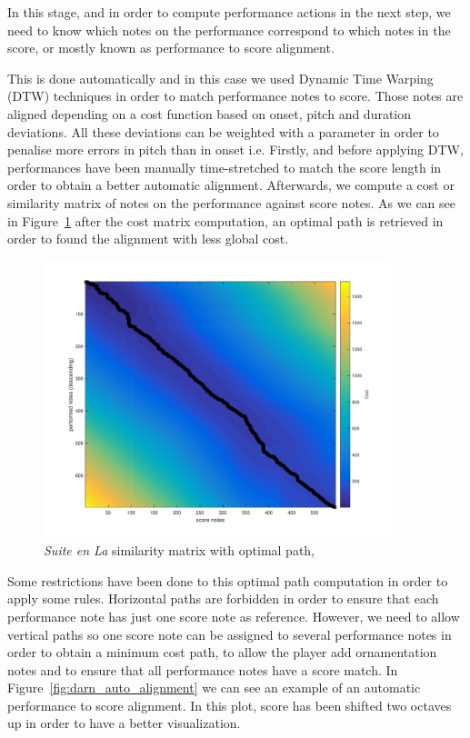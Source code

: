 In this stage, and in order to compute performance actions in the next step, we need to know which notes on the performance correspond to which notes in the score, or mostly known as performance to score alignment.

This is done automatically and in this case we used Dynamic Time Warping (DTW) techniques in order to match performance notes to score. Those notes are aligned depending on a cost function based on onset, pitch and duration deviations. All these deviations can be weighted with a parameter in order to penalise more errors in pitch than in onset i.e. Firstly, and before applying DTW, performances have been manually time-stretched to match the score length in order to obtain a better automatic alignment. Afterwards, we compute a cost or similarity matrix of notes on the performance against score notes. As we can see in Figure~\ref{fig:suite_cost_matrix} after the cost matrix computation, an optimal path is retrieved in order to found the alignment with less global cost.

\begin{figure}[ht!]
\centering
\includegraphics[width=0.9\textwidth]{Figures/Suite_en_la_cost.pdf}
\caption{\textit{Suite en La} similarity matrix with optimal path,}
\label{fig:suite_cost_matrix}
\end{figure}

Some restrictions have been done to this optimal path computation in order to apply some rules. Horizontal paths are forbidden in order to ensure that each performance note has just one score note as reference. However, we need to allow vertical paths so one score note can be assigned to several performance notes in order to obtain a minimum cost path, to allow the player add ornamentation notes and to ensure that all performance notes have a score match. In Figure~\ref{fig:darn_auto_alignment} we can see an example of an automatic performance to score alignment. In this plot, score has been shifted two octaves up in order to have a better visualization.

